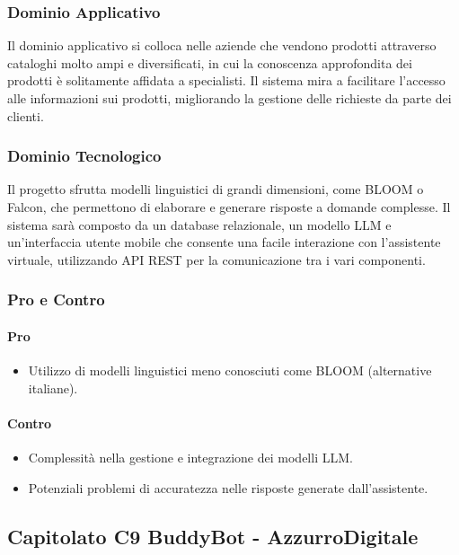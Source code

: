 \documentclass{article}
\begin{document}
\subsubsection{Dominio Applicativo}
Il dominio applicativo si colloca nelle aziende che vendono prodotti attraverso 
cataloghi molto ampi e diversificati, in cui la conoscenza approfondita dei prodotti è 
solitamente affidata a specialisti. Il sistema mira a facilitare l'accesso alle informazioni sui prodotti, 
migliorando la gestione delle richieste da parte dei clienti.

\subsubsection{Dominio Tecnologico}
Il progetto sfrutta modelli linguistici di grandi dimensioni, 
come BLOOM o Falcon, che permettono di elaborare e generare risposte a domande complesse. 
Il sistema sarà composto da un database relazionale, un modello LLM e un’interfaccia 
utente mobile che consente una facile interazione con l'assistente virtuale, 
utilizzando API REST per la comunicazione tra i vari componenti.

\subsubsection{Pro e Contro}

\paragraph{Pro}
\begin{itemize}
    \item Utilizzo di modelli linguistici meno conosciuti come BLOOM (alternative italiane).
\end{itemize}

\paragraph{Contro}
\begin{itemize}
    \item Complessità nella gestione e integrazione dei modelli LLM.
    \item Potenziali problemi di accuratezza nelle risposte generate dall'assistente.
\end{itemize}

\subsection{Capitolato C9 BuddyBot - AzzurroDigitale}
\end{document}
